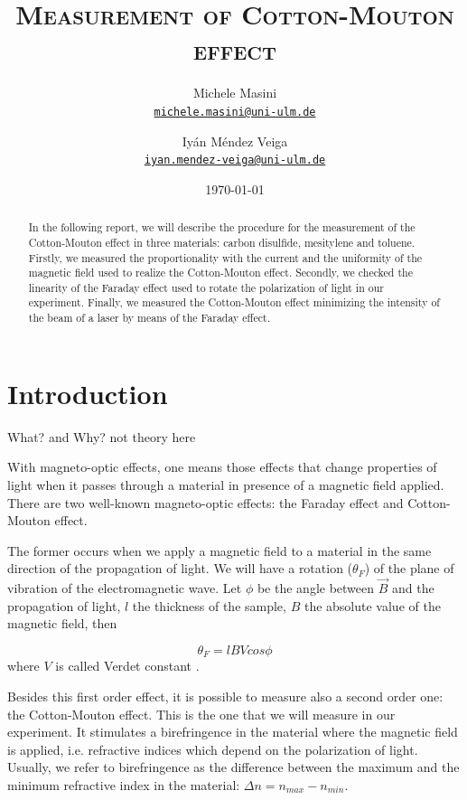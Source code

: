 \documentclass[11pt,a4paper]{article}
\title{\bfseries\textsc{Measurement of Cotton-Mouton effect}}
\author{
Michele Masini\\ \small\texttt{\href{mailto:michele.masini@uni-ulm.de}{michele.masini@uni-ulm.de}}\and
Iyán Méndez Veiga\\ \small\texttt{\href{mailto:iyan.mendez-veiga@uni-ulm.de}{iyan.mendez-veiga@uni-ulm.de}}
}
\date{\today}
\begin{document}
\maketitle

\begin{abstract}
In the following report, we will describe the procedure for the measurement of the Cotton-Mouton effect in three materials: carbon disulfide, mesitylene and toluene. Firstly, we measured the proportionality with the current and the uniformity of the magnetic field used to realize the Cotton-Mouton effect. Secondly, we checked the linearity of the Faraday effect used to rotate the polarization of light in our experiment. Finally, we measured the Cotton-Mouton effect minimizing the intensity of the beam of a laser by means of the Faraday effect.
\end{abstract}

\vspace{1.5cm}

\section{Introduction}

{\color{red}What? and Why? not theory here}

\vspace{.5cm}

With magneto-optic effects, one means those effects that change properties of light when it passes through a material in presence of a magnetic field applied.	There are two well-known magneto-optic effects: the Faraday effect and Cotton-Mouton effect.
	
The former occurs when we apply a magnetic field to a material in the same direction of the propagation of light. We will have a rotation ($\theta_F$) of the plane of vibration of the electromagnetic wave. Let $\phi$ be the angle between $\vec{B}$ and the propagation of light, $l$ the thickness of the sample, $B$ the absolute value of the magnetic field, then

\begin{equation}
\theta_F=lBVcos\phi
\end{equation}
where $V$ is called Verdet constant \cite{cappelli2003cotton}. 

Besides this first order effect, it is possible to measure also a second order one: the Cotton-Mouton effect. This is the one that we will measure in our experiment. It stimulates a birefringence in the material where the magnetic field is applied, i.e. refractive indices which depend on the polarization of light. Usually, we refer to birefringence as the difference between the maximum and the minimum refractive index in the material: $\Delta n=n_{max}-n_{min}$.
\end{document}
